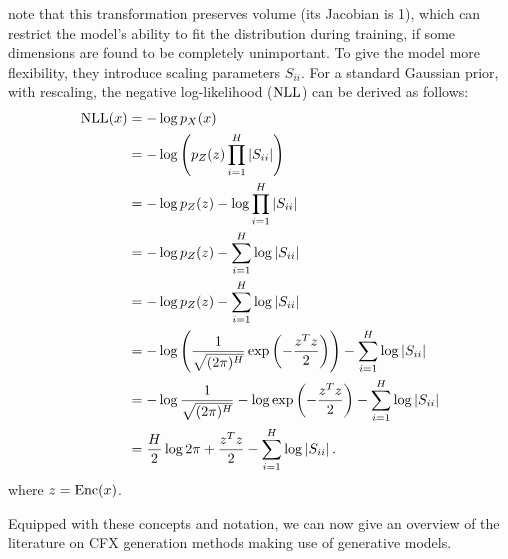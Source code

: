 \documentclass[../main.tex]{subfiles}
\begin{document}
\citeauthor{dinhNICE2015} note that this transformation preserves volume (its Jacobian is 1), which can restrict the model's ability to fit the distribution during training, \eg{} if some dimensions are found to be completely unimportant.
To give the model more flexibility, they introduce scaling parameters $S_{ii}$.
For a standard Gaussian prior, with rescaling, the negative log-likelihood ($\text{NLL}$) can be derived as follows:
\begin{align*}
    \text{NLL}(x)
     & = - \log p_X(x)                                                                               \\
     & = - \log \left( p_Z(z) \prod_{i=1}^H \left\lvert S_{ii}\right\rvert \right)                            \\
     & = - \log p_Z(z) - \log \prod_{i=1}^H \left\lvert S_{ii}\right\rvert                                    \\
     & = - \log p_Z(z) - \sum_{i=1}^H \log \left\lvert S_{ii}\right\rvert                                     \\
     & = - \log p_Z(z) - \sum_{i=1}^H \log \left\lvert S_{ii}\right\rvert                                     \\
     & = - \log \left( \frac{1}{\sqrt{(2 \pi)^H}} \exp\left(- \frac{z^T z}{2}\right)\right)
    - \sum_{i=1}^H \log \left\lvert S_{ii}\right\rvert                                                        \\
     & = - \log \frac{1}{\sqrt{(2 \pi)^H}}
    - \log \exp\left(- \frac{z^T z}{2}\right)
    - \sum_{i=1}^H \log \left\lvert S_{ii}\right\rvert                                                        \\
     & = \frac{H}{2} \log 2 \pi
    +  \frac{z^T z}{2}
    - \sum_{i=1}^H \log \left\lvert S_{ii}\right\rvert.
\end{align*}
where $z = \operatorname{Enc}(x)$.

Equipped with these concepts and notation, we can now give an overview of the literature on CFX generation methods making use of generative models.
\end{document}

